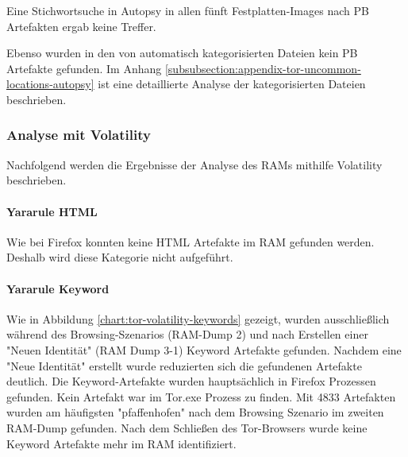 Eine Stichwortsuche in Autopsy in allen fünft Festplatten-Images nach PB Artefakten ergab keine Treffer.

Ebenso wurden in den von automatisch kategorisierten Dateien kein PB Artefakte gefunden. 
Im Anhang \ref{subsubsection:appendix-tor-uncommon-locations-autopsy} ist eine detaillierte Analyse der kategorisierten Dateien beschrieben.


\subsubsection*{Analyse mit Volatility}

Nachfolgend werden die Ergebnisse der Analyse des RAMs mithilfe Volatility beschrieben. 

\paragraph*{Yararule HTML}
Wie bei Firefox konnten keine HTML Artefakte im RAM gefunden werden. Deshalb wird diese Kategorie nicht aufgeführt.

\paragraph*{Yararule Keyword}
Wie in Abbildung \ref{chart:tor-volatility-keywords} gezeigt, wurden ausschließlich während des Browsing-Szenarios (RAM-Dump 2) und nach Erstellen einer "Neuen Identität" (RAM Dump 3-1) Keyword Artefakte gefunden.
Nachdem eine "Neue Identität" erstellt wurde reduzierten sich die gefundenen Artefakte deutlich. 
Die Keyword-Artefakte wurden hauptsächlich in Firefox Prozessen gefunden. Kein Artefakt war im Tor.exe Prozess zu finden.
Mit 4833 Artefakten wurden am häufigsten "pfaffenhofen" nach dem Browsing Szenario im zweiten RAM-Dump gefunden. 
Nach dem Schließen des Tor-Browsers wurde keine Keyword Artefakte mehr im RAM identifiziert.

